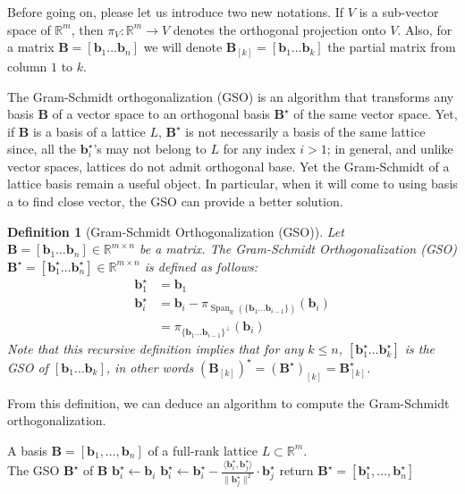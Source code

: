 \documentclass[12pt]{article}
\renewcommand{\vec}{\mathbf}
\newcommand{\ps}[2]{\langle {#1}, {#2} \rangle}
\newcommand{\R}{\mathbb R}
\newcommand{\Span}{\ensuremath{\operatorname{Span}}}
\newtheorem{definition}{Definition}{\bfseries}{\upshape}
\begin{document}
Before going on, please let us introduce two new notations. If $V$ is a sub-vector space of $\R^m$, then $\pi_V : \R^m \rightarrow V$ denotes the orthogonal projection onto $V$. Also, for a matrix $\vec B = [\vec b_1 \dots \vec b_n]$ we will denote $\vec B^{}_{[k]} = [\vec b_1 \dots \vec b_k]$ the partial matrix from column $1$ to $k$.


The Gram-Schmidt orthogonalization (GSO) is an algorithm that transforms any basis $\vec B$
of a vector space to an orthogonal basis $\vec B^\star$ of the same vector space. Yet, if $\vec B$
is a basis of a lattice $L$, $\vec B^\star$ is not necessarily a basis of the same lattice since,
all the $\vec b^\star_i$'s may not belong to $L$ for any index $i>1$; in general, and unlike vector
spaces, lattices do not admit orthogonal base. Yet the Gram-Schmidt of a lattice basis remain a 
useful object. In particular, when it will come to using basis a to find close
vector, the GSO can provide a better solution.

\begin{definition}[Gram-Schmidt Orthogonalization (GSO)]
\label{def:GSO}
Let $\vec B = [\vec b_1 \dots \vec b_n] \in \R^{m \times n}$ be a matrix. The Gram-Schmidt Orthogonalization (GSO)
$\vec B^\star = [\vec b^\star_1 \dots \vec b^\star_n] \in \R^{m \times n}$ is defined as follows:
\begin{align*}
	\vec b^\star_1 & = \vec b^{}_1 \\
	\vec b^\star_i & = \vec b^{}_i - \pi_{\Span_\R(\{\vec b_1 \dots \vec b_{i-1}\})}(\vec b^{}_i) \\ & = \pi_{\{\vec b_1 \dots \vec b_{i-1}\}^{\bot}}
	(\vec b_i)
\end{align*}
Note that this recursive definition implies that for any $k \leq n$, $[\vec b^\star_1 \dots \vec b^\star_k]$
is the GSO of $[\vec b_1 \dots \vec b_k]$, in other words $(\vec B^{}_{[k]})^\star = (\vec B_{}^\star)^{}_{[k]} = \vec B^\star_{[k]} $.
\end{definition}

From this definition, we can deduce an algorithm to compute the Gram-Schmidt orthogonalization.


\begin{algorithm}
\caption{Gram-Schmidt algorithm}
\label{alg:GSO}
\begin{algorithmic}[1]
    \REQUIRE A basis $\vec B = [\vec b_1, \dots, \vec b_n]$ of a full-rank lattice $L \subset \R^m$. \\
    \ENSURE The GSO $\vec B^\star$ of $\vec B$
  \STATE $\vec b^\star_i \gets \vec b_i$
  \STATE $\vec b^\star_i \gets \vec b^\star_i - \frac {\ps{\vec b_i^\star}{\vec b_j^\star}}  {\| \vec b_j^\star \|^2} \cdot \vec b_j^\star$
  \ENDFOR
  \ENDFOR
\STATE return $\vec B^\star = [\vec b_1^\star, \dots , \vec b_n^\star]$
  \end{algorithmic}
\end{algorithm}
\end{document}
